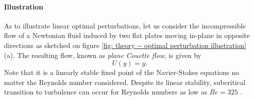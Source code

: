       \paragraph{Illustration}

      As to illustrate linear optimal perturbations, let us consider the incompressible flow of a Newtonian fluid induced by two flat plates moving in-plane in opposite directions as sketched on figure \ref{fig: theory -- optimal perturbation illustration}(a). The resulting flow, known as \emph{plane Couette flow}, is given by
      $$U(y) = y.$$
      Note that it is a linearly stable fixed point of the Navier-Stokes equations no matter the Reynolds number considered. Despite its linear stability, subcritical transition to turbulence can occur for Reynolds numbers as low as $Re=325$ \cite{M2016}.

